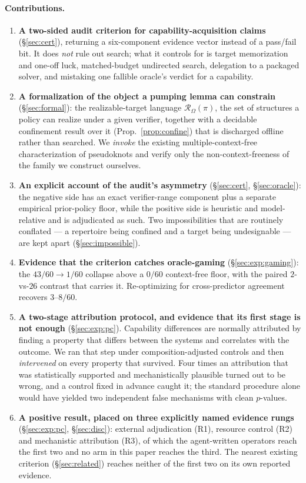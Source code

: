 \documentclass[11pt]{article}
\newcommand{\Rze}[2]{\ensuremath{\mathcal{R}_{#1}(#2)}}
\begin{document}
\paragraph{Contributions.}
\begin{enumerate}[leftmargin=1.3em,itemsep=1.5pt]
\item \textbf{A two-sided audit criterion for capability-acquisition claims} (\S\ref{sec:cert}), returning a
six-component evidence vector instead of a pass/fail bit. It does \emph{not} rule out search; what it controls
for is target memorization and one-off luck, matched-budget undirected search, delegation to a packaged
solver, and mistaking one fallible oracle's verdict for a capability.
\item \textbf{A formalization of the object a pumping lemma can constrain} (\S\ref{sec:formal}): the
realizable-target language $\Rze{\Omega}{\pi}$, the set of structures a policy can realize under a given
verifier, together with a decidable confinement result over it (Prop.~\ref{prop:confine}) that is discharged
offline rather than searched. We \emph{invoke} the existing multiple-context-free characterization of
pseudoknots and verify only the non-context-freeness of the family we construct ourselves.
\item \textbf{An explicit account of the audit's asymmetry} (\S\ref{sec:cert}, \S\ref{sec:oracle}): the
negative side has an exact verifier-range component plus a separate empirical prior-policy floor, while the
positive side is heuristic and model-relative and is adjudicated as such. Two impossibilities that are
routinely conflated --- a repertoire being confined and a target being undesignable --- are kept apart
(\S\ref{sec:impossible}).
\item \textbf{Evidence that the criterion catches oracle-gaming} (\S\ref{sec:exp:gaming}): the
$43/60\to1/60$ collapse above a $0/60$ context-free floor, with the paired $2$-vs-$26$ contrast that carries
it. Re-optimizing for cross-predictor agreement recovers $3$--$8/60$.
\item \textbf{A two-stage attribution protocol, and evidence that its first stage is not enough}
(\S\ref{sec:exp:pc}). Capability differences are normally attributed by finding a property that differs
between the systems and correlates with the outcome. We ran that step under composition-adjusted controls and
then \emph{intervened} on every property that survived. Four times an attribution that was statistically
supported and mechanistically plausible turned out to be wrong, and a control fixed in advance caught it; the
standard procedure alone would have yielded two independent false mechanisms with clean $p$-values.
\item \textbf{A positive result, placed on three explicitly named evidence rungs} (\S\ref{sec:exp:pc},
\S\ref{sec:disc}): external adjudication (R1), resource control (R2) and mechanistic attribution
(R3), of which the agent-written operators reach the first two and no arm in this paper reaches the
third. The nearest existing criterion (\S\ref{sec:related}) reaches neither of the first two on its own
reported evidence.
\end{enumerate}
\end{document}
